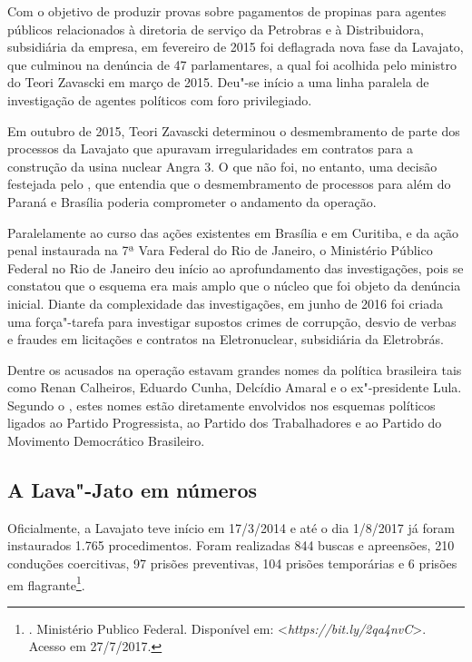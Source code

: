 Com o objetivo de produzir provas sobre pagamentos de propinas para
agentes públicos relacionados à diretoria de serviço da Petrobras e à 
Distribuidora, subsidiária da empresa, em fevereiro de 2015 foi
deflagrada nova fase da Lavajato, que culminou na denúncia de 47
parlamentares, a qual foi acolhida pelo ministro do  Teori Zavascki
em março de 2015. Deu"-se início a uma linha paralela de investigação de
agentes políticos com foro privilegiado.

Em outubro de 2015, Teori Zavascki determinou o desmembramento de parte
dos processos da Lavajato que apuravam irregularidades em contratos para
a construção da usina nuclear Angra 3. O que não foi, no entanto, uma
decisão festejada pelo , que entendia que o desmembramento de
processos para além do Paraná e Brasília poderia comprometer o andamento da
operação.

Paralelamente ao curso das ações existentes em Brasília e em Curitiba, e
da ação penal instaurada na 7ª Vara Federal do Rio de Janeiro, o
Ministério Público Federal no Rio de Janeiro deu início ao
aprofundamento das investigações, pois se constatou que o esquema era
mais amplo que o núcleo que foi objeto da denúncia inicial. Diante da
complexidade das investigações, em junho de 2016 foi criada uma
força"-tarefa para investigar supostos crimes de corrupção, desvio de
verbas e fraudes em licitações e contratos na Eletronuclear, subsidiária
da Eletrobrás.

Dentre os acusados na operação estavam grandes nomes da política
brasileira tais como Renan Calheiros, Eduardo Cunha, Delcídio Amaral e o
ex"-presidente Lula. Segundo o , estes nomes estão diretamente
envolvidos nos esquemas políticos ligados ao Partido Progressista, ao
Partido dos Trabalhadores e ao Partido do Movimento Democrático
Brasileiro.

\subsection{A Lava"-Jato em números}

Oficialmente, a Lavajato teve início em 17/3/2014 e até o dia 1/8/2017
já foram instaurados 1.765 procedimentos. Foram realizadas 844 buscas e
apreensões, 210 conduções coercitivas, 97 prisões preventivas, 104
prisões temporárias e 6 prisões em flagrante\footnote{. Ministério Publico
  Federal. Disponível em: \textless{}\emph{https://bit.ly/2qa4nvC}\textgreater{}. Acesso
  em 27/7/2017.}.

